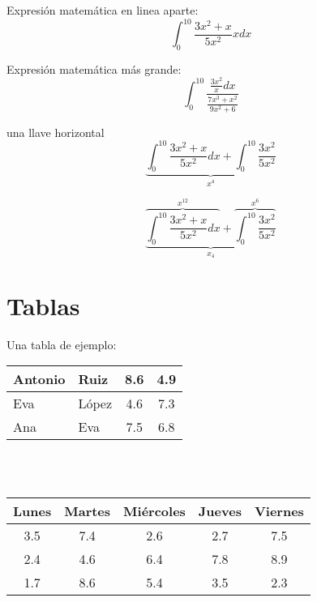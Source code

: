 \documentclass[10pt,a4paper]{report}
\begin{document}
Expresión matemática en linea aparte:
$$ \int_{0}^{10} \frac{3x^2+x}{5x^2} x dx $$

Expresión matemática más grande:
$$ \int_{0}^{10} \frac{\frac{3x^2} x dx}{\frac{7x^3+x^2}{9x^2+6}} $$

una llave horizontal
$$ \underbrace{
		\int_{0}^{10}
			\frac{3x^2+x}{5x^2} dx
		+
		\int_{0}^{10}
			\frac{3x^2}{5x^2}
}_{x^4}
$$

$$\underbrace{
	\overbrace{
		\int_{0}^{10}
			\frac{3x^2+x}{5x^2} dx
	}
	^{x^{12}}
	+
	\overbrace{
		\int_{0}^{10}
			\frac{3x^2}{5x^2}
	}^{x^6}
}_{x_4}
$$

\chapter{Tablas}

Una tabla de ejemplo: \\

\begin{tabular}{|l|l|c|c|}
  \hline Antonio 	& Ruiz	& 8.6 & 4.9 \\
  \hline Eva			& López & 4.6 & 7.3 \\
  \hline Ana			& Eva	& 7.5 & 6.8 \\
  \hline
  
\end{tabular} \\ \\

\begin{tabular}{|c|c|c|c|c|}
  \hline Lunes 	& Martes	& Miércoles	& Jueves	& Viernes \\
  \hline	 3.5		& 7.4	& 2.6		& 2.7	& 7.5 \\
  \hline 2.4		& 4.6	& 6.4		& 7.8	& 8.9 \\
  \hline 1.7		& 8.6	& 5.4		& 3.5	& 2.3 \\
  \hline

\end{tabular}
\end{document}
